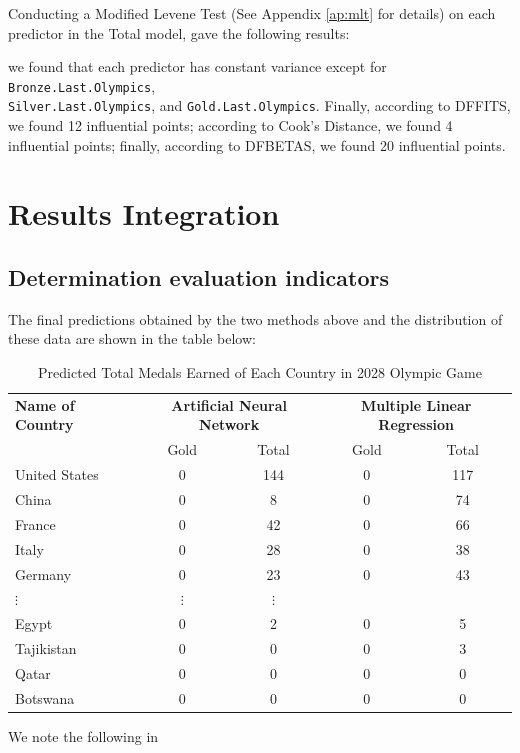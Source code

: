 \documentclass{mcmthesis}
\begin{document}
Conducting a Modified Levene Test (See Appendix \ref{ap:mlt} for details) on each predictor in the Total model, gave the following results:

we found that each predictor has constant variance except for \texttt{Bronze.Last.Olympics}, \\ \texttt{Silver.Last.Olympics}, and \texttt{Gold.Last.Olympics}. Finally, according to DFFITS, we found 12 influential points; according to Cook's Distance, we found 4 influential points; finally, according to DFBETAS, we found 20 influential points.

\section{Results Integration}\label{RestultsIntegration}
\subsection{Determination evaluation indicators}
The final predictions obtained by the two methods above and the distribution of these data are shown in the table below:
\begin{table}[H]
\centering 
\label{A}
 \caption{Predicted Total Medals Earned of Each Country in 2028 Olympic Game}
\vspace{5pt}
\begin{tabular}{lcccc}
\hline
\textbf{Name of Country} & 
\multicolumn{2}{c}{\textbf{Artificial Neural Network}} &
\multicolumn{2}{c}{\textbf{Multiple Linear Regression}} \\
\cline{2-5}
& Gold & Total & Gold & Total \\
\hline\hline
United States & 0 & 144 & 0 & 117 \\
China & 0 & 8 & 0 & 74 \\
France & 0 & 42 & 0 & 66 \\
Italy & 0 & 28 & 0 & 38 \\
Germany & 0 & 23 & 0 & 43 \\ 
$\vdots$ & $\vdots$ & $\vdots$ \\ 
Egypt & 0 & 2 & 0 & 5 \\
Tajikistan & 0 & 0 & 0 & 3 \\
Qatar & 0 & 0 & 0 & 0\\
Botswana & 0 & 0 & 0 & 0\\ 
\hline
\end{tabular}
\end{table}

We note the following in 
\end{document}
